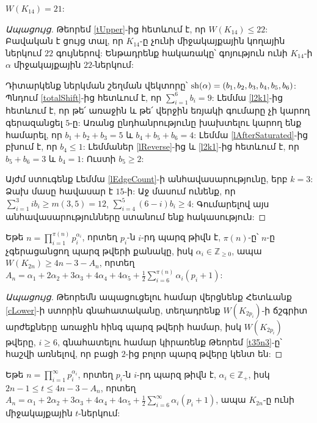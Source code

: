 \begin{hide}
\begin{lemma}
\label{lK14}
$W(K_{14}) = 21$:
\end{lemma}
\begin{proof}[Ապացույց]
Թեորեմ \ref{tUpper}-ից հետևում է, որ $W(K_{14}) \leq 22$: Բավական է ցույց տալ, որ $K_{14}$-ը չունի միջակայքային կողային ներկում $22$ գույներով: Ենթադրենք հակառակը՝ գոյություն ունի $K_{14}$-ի $\alpha$ միջակայքային $22$-ներկում:

Դիտարկենք ներկման շեղման վեկտորը՝ ${\rm sh}(\alpha)=(b_1,b_2,b_3,b_4,b_5,b_6)$: Պնդում \ref{totalShift}-ից հետևում է, որ $\sum\limits_{i=1}^{6}{b_i}=9$: Լեմմա \ref{l2k1}-ից հետևում է, որ թե՛ առաջին և թե՛ վերջին եռյակի գումարը չի կարող գերազանցել $5$-ը: Առանց ընդհանրությունը խախտելու կարող ենք համարել, որ $b_1+b_2+b_3=5$ և $b_4+b_5+b_6=4$: Լեմմա \ref{lAfterSaturated}-ից բխում է, որ $b_4 \leq 1$: Լեմմաներ \ref{lReverse}-ից և \ref{l2k1}-ից հետևում է, որ $b_5+b_6=3$ և $b_4=1$: Ուստի $b_5 \geq 2$:

Այժմ ստուգենք Լեմմա \ref{lEdgeCount}-ի անհավասարությունը, երբ $k=3$: Ձախ մասը հավասար է $15$-ի: Աջ մասում ունենք, որ $\sum\limits_{i=1}^{3}{ib_i} \geq m(3,5) = 12$, $\sum\limits_{i=4}^{5}{(6-i)b_i} \geq 4$: Գումարելով այս անհավասարությունները ստանում ենք հակասություն:
\end{proof}
\end{hide}

\begin{theorem}
\label{t1-complete-W-lower-best}
Եթե $n = \prod_{i=1}^{\pi(n)}{p_i^{\alpha_i}}$, որտեղ $p_i$-ն $i$-րդ պարզ թիվն է, $\pi(n)$-ը՝ $n$-ը չգերացանցող պարզ թվերի քանակը, իսկ $\alpha_i \in \mathbb{Z}_{\geq 0}$, ապա $W(K_{2n}) \geq 4n - 3 - A_n$, որտեղ $A_n = \alpha_1 + 2\alpha_2 + 3\alpha_3 + 4\alpha_4 + 4\alpha_5 + \frac{1}{2}\sum_{i=6}^{\pi(n)}{\alpha_i(p_i+1)}$:
\end{theorem}
\begin{proof}[Ապացույց]
Թեորեմն ապացուցելու համար վերցնենք Հետևանք \ref{cLower}-ի ստորին գնահատականը, տեղադրենք $W(K_{2p_i})$-ի ճշգրիտ արժեքները առաջին հինգ պարզ թվերի համար, իսկ $W(K_{2p_i})$ թվերը, $i\geq 6$, գնահատելու համար կիրառենք Թեորեմ \ref{t35n3}-ը՝ հաշվի առնելով, որ բացի $2$-ից բոլոր պարզ թվերը կենտ են:
\end{proof}
\begin{hide}
\begin{corollary}
Եթե $n = \prod\limits_{i=1}^{\infty}{p_i^{\alpha_i}}$, որտեղ $p_i$-ն $i$-րդ պարզ թիվն է, $\alpha_i \in \mathbb{Z}_+$, իսկ $2n-1 \leq t \leq 4n - 3 - A_n$, որտեղ $A_n = \alpha_1 + 2\alpha_2 + 3\alpha_3 + 4\alpha_4 + 4\alpha_5 + \frac{1}{2}\sum\limits_{i=6}^{\infty}{\alpha_i(p_i+1)}$, ապա $K_{2n}$-ը ունի միջակայքային $t$-ներկում:
\end{corollary}
\end{hide}

